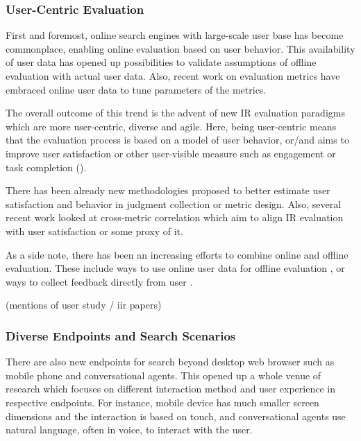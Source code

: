 \documentclass[openany]{now} %
\begin{document}
\subsubsection{User-Centric Evaluation}
First and foremost, online search engines with large-scale user base has become commonplace, enabling online evaluation based on user behavior. This availability of user data has opened up possibilities to validate assumptions of offline evaluation with actual user data. Also, recent work on evaluation metrics \cite{} \cite{} have embraced online user data to tune parameters of the metrics.

The overall outcome of this trend is the advent of new IR evaluation paradigms which are more user-centric, diverse and agile. Here, being user-centric means that the evaluation process is based on a model of user behavior, or/and aims to improve user satisfaction or other user-visible measure such as engagement or task completion (\cite{scholer13}). 

There has been already new methodologies proposed to better estimate user satisfaction and behavior in judgment collection \cite{VermaY16, VermaYC16} or metric design\cite{YilmazSCR10, CarteretteKY11, ChapelleMZG09}. Also, several recent work looked at cross-metric correlation \cite{Al-Maskari2007} \cite{radl:comp10} which aim to align IR evaluation with user satisfaction or some proxy of it.

As a side note, there has been an increasing efforts to combine online and offline evaluation. These include ways to use online user data for offline evaluation \cite{Li:2015} \cite{li2010contextual} \cite{chuklin2015click}, or ways to collect feedback directly from user \cite{Kim2016}. 

(mentions of user study / iir papers)

\subsubsection{Diverse Endpoints and Search Scenarios}

There are also new endpoints for search beyond desktop web browser such as mobile phone and conversational agents. This opened up a whole venue of research which focuses on different interaction method and user experience in respective endpoints. For instance, mobile device has much smaller screen dimensions and the interaction is based on touch, and conversational agents use natural language, often in voice, to interact with the user.
\end{document}
